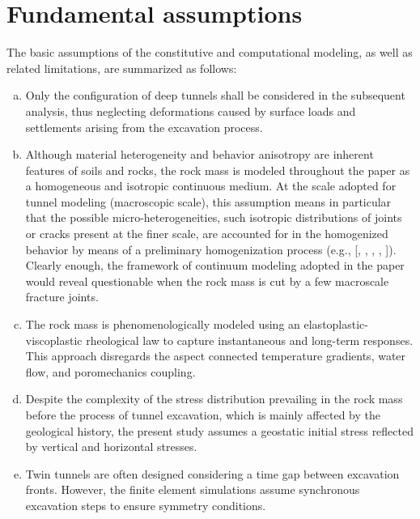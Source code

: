 \documentclass[a4paper,fleqn]{cas-sc}
\begin{document}
\section{Fundamental assumptions}\label{section_assumptions}

The basic assumptions of the constitutive and computational modeling, as well as related limitations, are summarized as follows:

\begin{enumerate}[(a)]
	\item Only the configuration of deep tunnels shall be considered in the subsequent analysis, thus neglecting deformations caused by surface loads and settlements arising from the excavation process.

	\item Although material heterogeneity and behavior anisotropy are inherent features of soils and rocks, the rock mass is modeled throughout the paper as a homogeneous and isotropic continuous medium. At the scale adopted for tunnel modeling (macroscopic scale), this assumption means in particular that the possible micro-heterogeneities, such isotropic distributions of joints or cracks present at the finer scale, are accounted for in the homogenized behavior by means of a preliminary homogenization process (e.g., [, , , , ]). Clearly enough, the framework of continuum modeling adopted in the paper would reveal questionable when the rock mass is cut by a few macroscale fracture joints.  
	
	\item The rock mass is phenomenologically modeled using an elastoplastic-viscoplastic rheological law to capture instantaneous and long-term responses. This approach disregards the aspect connected temperature gradients, water flow, and poromechanics coupling.

	\item Despite the complexity of the stress distribution prevailing in the rock mass before the process of tunnel excavation, which is mainly affected by the geological history, the present study assumes a geostatic initial stress reflected by vertical and horizontal stresses.

	\item Twin tunnels are often designed considering a time gap between excavation fronts. However, the finite element simulations assume synchronous excavation steps to ensure symmetry conditions.


\end{enumerate}
\end{document}
